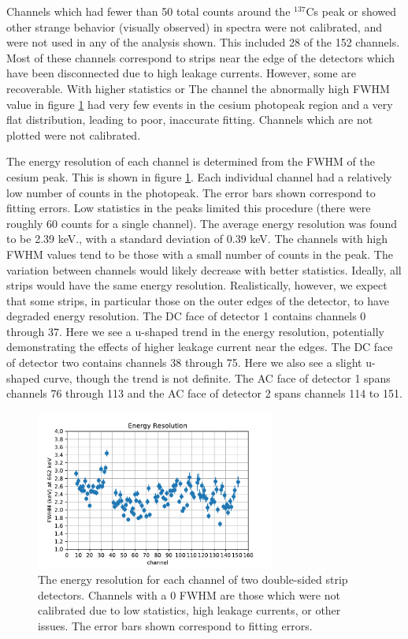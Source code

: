 Channels which had fewer than 50 total counts around the ${}^{137}$Cs peak or showed other strange behavior (visually observed) in spectra were not calibrated, and were not used in any of the analysis shown. This included 28 of the 152 channels. Most of these channels correspond to strips near the edge of the detectors which have been disconnected due to high leakage currents. However, some are recoverable. With higher statistics or The channel the abnormally high FWHM value in figure \ref{fwhm} had very few events in the cesium photopeak region and a very flat distribution, leading to poor, inaccurate fitting. Channels which are not plotted were not calibrated.

The energy resolution of each channel is determined from the FWHM of the cesium peak. This is shown in figure \ref{fwhm}. Each individual channel had a relatively low number of counts in the photopeak. The error bars shown correspond to fitting errors. Low statistics in the peaks limited this procedure (there were roughly 60 counts for a single channel). The average energy resolution was found to be 2.39 keV., with a standard deviation of 0.39 keV. The channels with high FWHM values tend to be those with a small number of counts in the peak. The variation between channels would likely decrease with better statistics. Ideally, all strips would have the same energy resolution. Realistically, however, we expect that some strips, in particular those on the outer edges of the detector, to have degraded energy resolution. The DC face of detector 1 contains channels 0 through 37. Here we see a u-shaped trend in the energy resolution, potentially demonstrating the effects of higher leakage current near the edges. The DC face of detector two contains channels 38 through 75. Here we also see a slight u-shaped curve, though the trend is not definite. The AC face of detector 1 spans channels 76 through 113 and the AC face of detector 2 spans channels 114 to 151.

\begin{figure}
\begin{centering}
\includegraphics[width=0.7\textwidth]{./figures/energy_res.pdf}
\caption{The energy resolution for each channel of two double-sided strip detectors. Channels with a 0 FWHM are those which were not calibrated due to low statistics, high leakage currents, or other issues. The error bars shown correspond to fitting errors.}
\label{fwhm}
\end{centering}
\end{figure}

